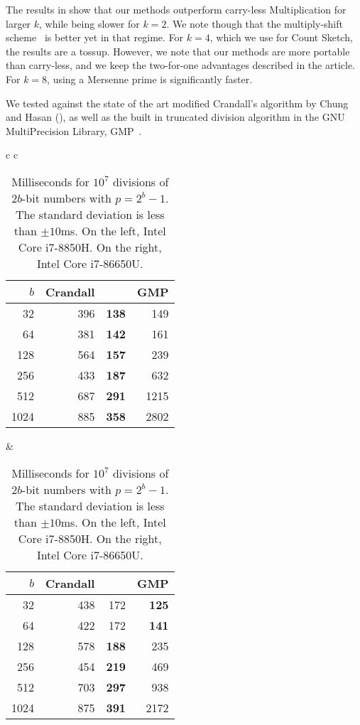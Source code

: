 The results in  show that our methods outperform carry-less Multiplication for larger $k$, while being slower for $k=2$.
We note though that the multiply-shift scheme~\cite{dietzfel96universal} is better yet in that regime.
For $k=4$, which we use for Count Sketch, the results are a tossup.
However, we note that our methods are more portable than carry-less, and we keep the two-for-one advantages described in the article.
For $k = 8$, using a Mersenne prime is significantly faster.
\vspace{.5em} %

We tested  against the state of the art modified Crandall's algorithm by Chung and Hasan (), as well as the built in truncated division algorithm in the GNU MultiPrecision Library, GMP~\cite{granlund2010gnu}.

\begin{table}[H]
   \centering
   \begin{tabular}{ c c }
      \begin{tabular}{ r | r r r }
         $b$ & Crandall & \Cref{alg:division-generalized} & GMP \\
         \hline
         32 & 396 & \textbf   {138}  & 149\\
         64 & 381 &   \textbf {142}  & 161\\
         128 & 564 &  \textbf {157}  & 239\\
         256 & 433 &  \textbf {187}  & 632\\
         512 & 687 &  \textbf {291}  & 1215\\
         1024 & 885 & \textbf {358}  & 2802
      \end{tabular}
      \hspace{.5em}
      &
      \hspace{.5em}
      \begin{tabular}{ r | r r r }
         $b$ & Crandall & \Cref{alg:division-generalized} & GMP \\
         \hline
         32 & 438 & 172 & \textbf{125}\\
         64 & 422 & 172 & \textbf{141}\\
         128 & 578 &      \textbf{188} & 235\\
         256 & 454 &      \textbf{219} & 469\\
         512 & 703 &      \textbf{297} & 938\\
         1024 & 875 &     \textbf{391} & 2172
      \end{tabular}
   \end{tabular}
   \caption{Milliseconds for $10^7$ divisions of $2b$-bit numbers with $p=2^b-1$.
      The standard deviation is less than $\pm10$ms.
         On the left, Intel Core i7-8850H.
         On the right, Intel Core i7-86650U.
   }
   \label{tab:division-experiments}
\end{table}


